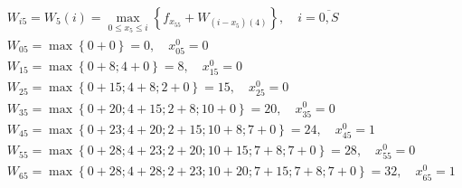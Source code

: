 \begin{align*}
     & W_{i5} = W_5(i) = \max\limits_{0 \leq x_5 \leq i} \left\{ f_{x_55} + W_{(i-x_5)(4)} \right\}, \quad i = \overline{0, S} \\
     & W_{05} = \max \left\{0 + 0\right\} = 0, \quad x_{05}^0 = 0                                                              \\
     & W_{15} = \max \left\{0 + 8; 4 + 0\right\} = 8, \quad x_{15}^0 = 0                                                       \\
     & W_{25} = \max \left\{0 + 15; 4 + 8; 2 + 0\right\} = 15, \quad x_{25}^0 = 0                                              \\
     & W_{35} = \max \left\{0 + 20; 4 + 15; 2 + 8; 10 + 0\right\} = 20, \quad x_{35}^0 = 0                                     \\
     & W_{45} = \max \left\{0 + 23; 4 + 20; 2 + 15; 10 + 8; 7 + 0\right\} = 24, \quad x_{45}^0 = 1                             \\
     & W_{55} = \max \left\{0 + 28; 4 + 23; 2 + 20; 10 + 15; 7 + 8; 7 + 0\right\} = 28, \quad x_{55}^0 = 0                     \\
     & W_{65} = \max \left\{0 + 28; 4 + 28; 2 + 23; 10 + 20; 7 + 15; 7 + 8; 7 + 0\right\} = 32, \quad x_{65}^0 = 1
\end{align*}

